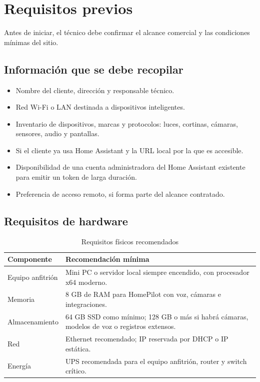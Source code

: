 \section{Requisitos previos}

Antes de iniciar, el técnico debe confirmar el alcance comercial y las condiciones mínimas del sitio.

\subsection{Información que se debe recopilar}
\begin{itemize}[itemsep=0.15cm]
    \item Nombre del cliente, dirección y responsable técnico.
    \item Red Wi-Fi o LAN destinada a dispositivos inteligentes.
    \item Inventario de dispositivos, marcas y protocolos: luces, cortinas, cámaras, sensores, audio y pantallas.
    \item Si el cliente ya usa Home Assistant y la URL local por la que es accesible.
    \item Disponibilidad de una cuenta administradora del Home Assistant existente para emitir un token de larga duración.
    \item Preferencia de acceso remoto, si forma parte del alcance contratado.
\end{itemize}

\subsection{Requisitos de hardware}
\begin{table}[h]
\centering
\begin{tabularx}{\textwidth}{|L{0.30\textwidth}|X|}
\hline
\textbf{Componente} & \textbf{Recomendación mínima} \\
\hline
Equipo anfitrión & Mini PC o servidor local siempre encendido, con procesador x64 moderno. \\
Memoria & 8 GB de RAM para HomePilot con voz, cámaras e integraciones. \\
Almacenamiento & 64 GB SSD como mínimo; 128 GB o más si habrá cámaras, modelos de voz o registros extensos. \\
Red & Ethernet recomendado; IP reservada por DHCP o IP estática. \\
Energía & UPS recomendada para el equipo anfitrión, router y switch crítico. \\
\hline
\end{tabularx}
\caption{Requisitos físicos recomendados}
\end{table}

